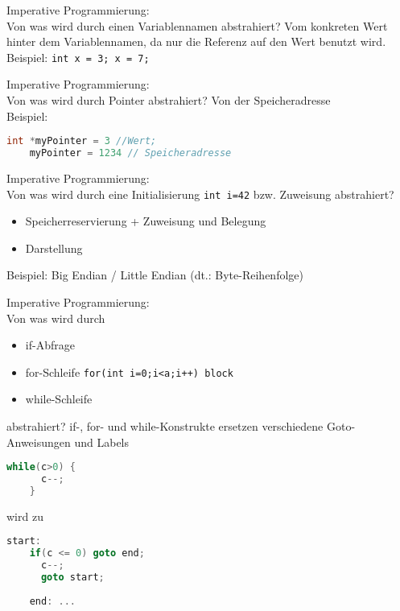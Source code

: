 \begin{card}
	Imperative Programmierung:\\
	Von was wird durch einen Variablennamen abstrahiert?
	\hr
	Vom konkreten Wert hinter dem Variablennamen, da nur die Referenz auf den Wert benutzt wird.\\
		Beispiel: \texttt{int x = 3; x = 7;}
\end{card}

\begin{card}
	Imperative Programmierung:\\
	Von was wird durch Pointer abstrahiert?
	\hr
	Von der Speicheradresse\\
	Beispiel:
	\begin{lstlisting}[language=C]
	int *myPointer = 3 //Wert;
	myPointer = 1234 // Speicheradresse
	\end{lstlisting}
\end{card}

\begin{card}
	Imperative Programmierung:\\
	Von was wird durch eine Initialisierung \texttt{int i=42} bzw. Zuweisung abstrahiert?
	\hr
	\begin{itemize}
	\item Speicherreservierung + Zuweisung und Belegung
	\item Darstellung
	\end{itemize}
	Beispiel: Big Endian / Little Endian (dt.: Byte-Reihenfolge)
\end{card}

\begin{card}
	Imperative Programmierung:\\
	Von was wird durch 
	\begin{itemize}
	\item if-Abfrage
	\item for-Schleife \texttt{for(int i=0;i<a;i++) block} 
	\item while-Schleife
	\end{itemize}
	abstrahiert?
	\hr
	if-, for- und while-Konstrukte ersetzen verschiedene Goto-Anweisungen und Labels 
	\begin{lstlisting}[language=C]
	while(c>0) {
	  c--;
	}
	\end{lstlisting}
	wird zu 
	\begin{lstlisting}[language=C]
	start:
	if(c <= 0) goto end;
	  c--;
	  goto start;
	
	end: ...
	\end{lstlisting}
\end{card}

